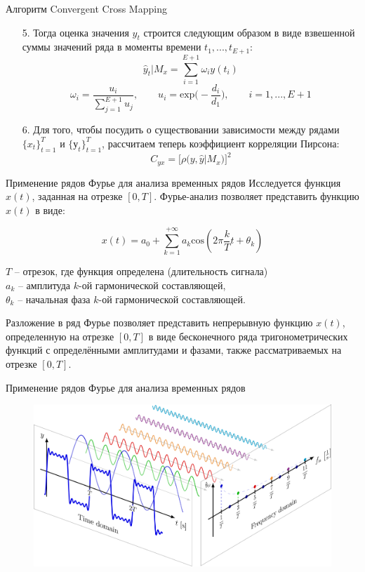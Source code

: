 \begin{frame}{Алгоритм Convergent Cross Mapping}

\begin{enumerate}

    \item[5.] Тогда оценка значения $y_t$ строится следующим образом в виде взвешенной суммы значений ряда в моменты времени $t_1, ..., t_{E+1}$:
    $$ \hat{y}_t|M_x = \sum_{i=1}^{E+1} \omega_i y(t_i)$$
    $$ \omega_i = \frac{u_i}{\displaystyle \sum_{j=1}^{E + 1}u_j}, \quad \quad u_i = \text{exp}\Big(-\frac{d_i}{d_1}\Big), \quad \quad i = 1, ..., E+1$$
    \item[6.] Для того, чтобы посудить о существовании зависимости между рядами $\{x_t\}_{t=1}^T$ и $\{у_t\}_{t=1}^T$, рассчитаем теперь коэффициент корреляции Пирсона:
    $$ C_{yx} = \Bigg[\rho \Big( y, \hat{y}|M_x \Big) \Bigg]^2$$

\end{enumerate}

\end{frame}
\begin{frame}{Применение рядов Фурье для анализа временных рядов}
Исследуется функция $x(t)$, заданная на отрезке $[0, T]$.\newline
Фурье-анализ позволяет представить функцию $x(t)$ в виде:

$$x(t) = a_0 + \sum_{k=1}^{+\infty}a_k \text{cos}(2\pi\frac{k}{T}t + \theta_k)$$

$T$ -- отрезок, где функция определена (длительность сигнала)\\
$a_k$ -- амплитуда $k$-ой гармонической составляющей,\\
$\theta_k$ -- начальная фаза $k$-ой гармонической составляющей.
\vspace{0.5cm}

Разложение в ряд Фурье позволяет представить непрерывную функцию $x(t)$, определенную на отрезке $[0, T]$ в виде бесконечного ряда тригонометрических функций с определёнными амплитудами и фазами, также рассматриваемых на отрезке $[0, T]$.

\end{frame}
\begin{frame}{Применение рядов Фурье для анализа временных рядов}
\begin{figure}
    \centering
    \includegraphics[width=\textwidth]{lecture_6/fourier_series_2.png}
\end{figure}
\end{frame}
